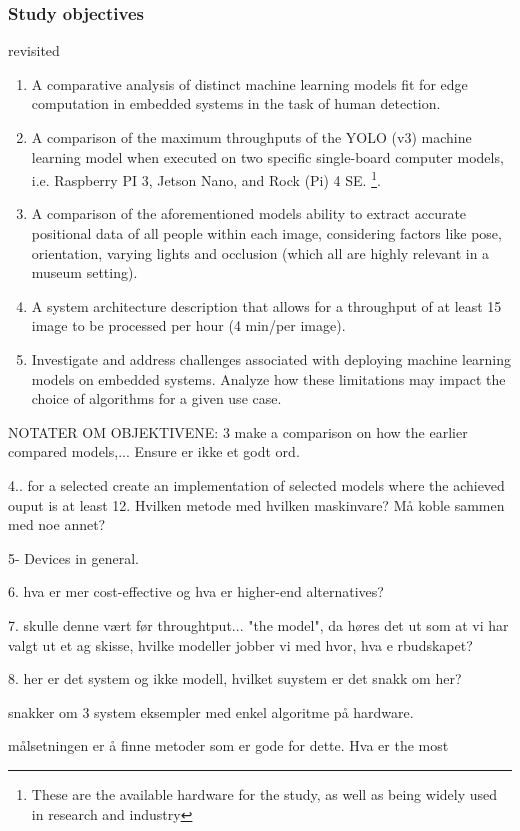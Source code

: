 \subsubsection*{Study objectives} revisited
\begin{enumerate}
    \item A comparative analysis of distinct machine learning models fit for edge computation in embedded systems in the task of human detection.
    \item A comparison of the maximum throughputs of the YOLO (v3) machine learning model when executed on two specific single-board computer models, i.e. Raspberry PI 3, Jetson Nano, and Rock (Pi) 4 SE. \footnote{These are the available hardware for the study, as well as being widely used in research and industry}.
    \item A comparison of the aforementioned models ability to extract accurate positional data of all people within each image, considering factors like pose, orientation, varying lights and occlusion (which all are highly relevant in a museum setting).
    \item A system architecture description that allows for a throughput of at least 15 image to be processed per hour (4 min/per image).
    \item Investigate and address challenges associated with deploying machine learning models on embedded systems. Analyze how these limitations may impact the choice of algorithms for a given use case.
\end{enumerate}

NOTATER OM OBJEKTIVENE:
3 make a comparison on how the earlier compared models,... Ensure er ikke et godt ord. 

4.. for a selected create an implementation of selected models where the achieved ouput is at least 12. Hvilken metode med hvilken maskinvare? Må koble sammen med noe annet?

5- Devices in general.

6. hva er mer cost-effective og hva er higher-end alternatives?

7. skulle denne vært før throughtput... 
"the model", da høres det ut som at vi har valgt ut et 
ag skisse, hvilke modeller jobber vi med hvor, hva e rbudskapet?

8. her er det system og ikke modell, hvilket suystem er det snakk om her? 

snakker om 3 system eksempler med enkel algoritme på hardware. 


målsetningen er å finne metoder som er gode for dette. Hva er the most 

